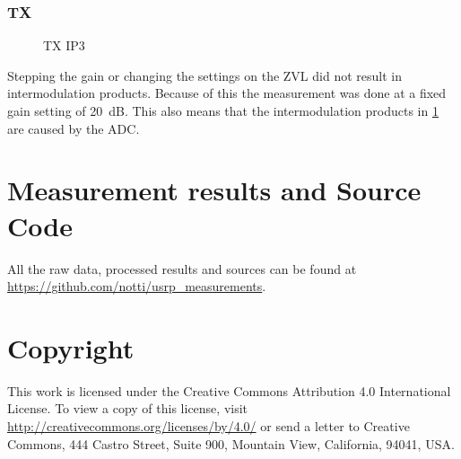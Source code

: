 \documentclass[12pt,a4paper,parskip=full,abstracton]{scrartcl}
\begin{document}
\subsubsection{TX}
\begin{figure}[htb]
    \centering
{}
    \caption{TX IP3}
    \label{fig:txip3}
\end{figure}
Stepping the gain or changing the settings on the ZVL did not result
in intermodulation products. Because of this the measurement was done
at a fixed gain setting of \SI{20}{\deci\bel}. This also means that
the intermodulation products in \cref{fig:txip3} are caused by the ADC.

\clearpage
\begin{appendix}
\section{Measurement results and Source Code}
\label{sec:sources}
All the raw data, processed results and sources can be found at
\url{https://github.com/notti/usrp_measurements}.
\section*{Copyright}
This work is licensed under the Creative Commons Attribution 4.0 International
License. To view a copy of this license, visit
\url{http://creativecommons.org/licenses/by/4.0/} or send a letter to Creative
Commons, 444 Castro Street, Suite 900, Mountain View, California, 94041, USA.

\printglossary[type=\acronymtype]

\listoffigures



\end{appendix}
\end{document}
